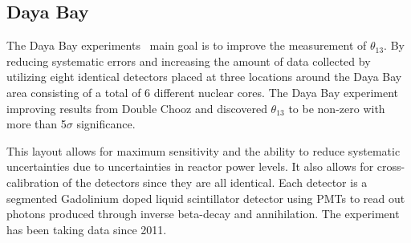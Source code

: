 \subsection{Daya Bay}

The Daya Bay experiments~\cite{44DayaBay} main goal is to improve the measurement of $\theta_{13}$. By reducing systematic errors and increasing the amount of data collected by utilizing eight identical detectors placed at three locations around the Daya Bay area consisting of a total of 6 different nuclear cores. The Daya Bay experiment  improving results from Double Chooz and discovered $\theta_{13}$ to be non-zero with more than 5$\sigma$ significance.

This layout allows for maximum sensitivity and the ability to reduce systematic uncertainties due to uncertainties in reactor power levels. It also allows for cross-calibration of the detectors since they are all identical. Each detector is a segmented Gadolinium doped liquid scintillator detector using PMTs to read out photons produced through inverse beta-decay and annihilation. The experiment has been taking data since 2011.

